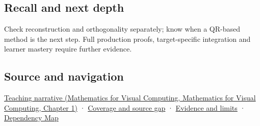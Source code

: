 \subsection{Recall and next depth}\label{appendix-c39f1ed34271-recall-and-next-depth}

Check reconstruction and orthogonality separately; know when a QR-based method is the next step. Full production proofs, target-specific integration and learner mastery require further evidence.

\subsection{Source and navigation}\label{appendix-c39f1ed34271-source-and-navigation}

\href{../02-Mathematics-for-Visual-Computing/main.pdf\#nameddest=01-foundations-i-ch017-orthonormal-frames-make-reconstruction-simple}{Teaching narrative (Mathematics for Visual Computing, Mathematics for Visual Computing, Chapter 1)} · \hyperref[appendix-fd090d982a15-phase-6---parts-501-600]{Coverage and source gap} · \hyperref[appendix-a103e7846d21-phase-6---source-analysis-and-verification]{Evidence and limits} · \hyperref[appendix-4ad47bdd269a]{Dependency Map}
